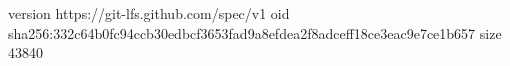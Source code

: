 version https://git-lfs.github.com/spec/v1
oid sha256:332c64b0fc94ccb30edbcf3653fad9a8efdea2f8adceff18ce3eac9e7ce1b657
size 43840
